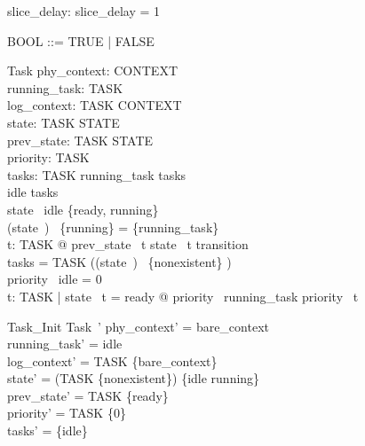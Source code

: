 \begin{zed}
    [QUEUE]
\end{zed}

\begin{axdef}
    slice\_delay: \nat
\where
    slice\_delay = 1 %
\end{axdef}

\begin{zed}
    BOOL ::= TRUE | FALSE
\end{zed}

\begin{schema}{Task}
    phy\_context: CONTEXT\\
    running\_task: TASK\\
    log\_context: TASK \fun CONTEXT\\
    state: TASK \fun STATE\\
    prev\_state: TASK \fun STATE\\
    priority: TASK \fun \nat\\
    tasks: \power TASK
\where
    running\_task \in tasks\\
    idle \in tasks\\
    state~ idle \in \{ready, running\}\\
    (state~\inv)~ \limg \{running\} \rimg = \{running\_task\}\\
    \forall t: TASK @ prev\_state~ t \mapsto state~ t \in transition\\
    tasks = TASK \setminus ((state~\inv)~ \limg \{nonexistent\} \rimg)\\
    priority~ idle = 0\\
    \forall t: TASK | state~ t = ready @ priority~ running\_task \geq priority~ t
\end{schema}


\begin{schema}{Task\_Init}
    Task~'
\where
    phy\_context' = bare\_context\\
    running\_task' = idle\\
    log\_context' = TASK \cross \{bare\_context\}\\
    state' = (TASK \cross \{nonexistent\}) \oplus \{idle \mapsto running\}\\
    prev\_state' = TASK \cross \{ready\}\\
    priority' = TASK \cross \{0\}\\
    tasks' = \{idle\}
\end{schema}

